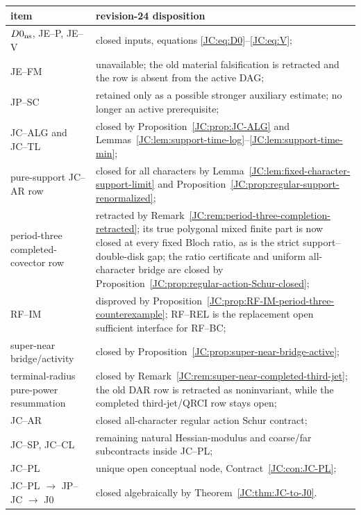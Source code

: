 \documentclass[11pt]{amsart}
\numberwithin{equation}{section}
\theoremstyle{definition}
\theoremstyle{remark}
\begin{document}
\begin{center}
\begin{longtable}{>{\raggedright\arraybackslash}p{.34\linewidth}
                  >{\raggedright\arraybackslash}p{.54\linewidth}}
\toprule
item & revision-24 disposition\\
\midrule
$D0_{\rm ns}$, JE--P, JE--V & closed inputs, equations
\eqref{JC:eq:D0}--\eqref{JC:eq:V};\\
JE--FM & unavailable; the old material falsification is retracted and the
row is absent from the active DAG;\\
JP--SC & retained only as a possible stronger auxiliary estimate; no
longer an active prerequisite;\\
JC--ALG and JC--TL & closed by Proposition~\ref{JC:prop:JC-ALG} and
Lemmas~\ref{JC:lem:support-time-log}--\ref{JC:lem:support-time-min};\\
pure-support JC--AR row & closed for all characters by
Lemma~\ref{JC:lem:fixed-character-support-limit} and
Proposition~\ref{JC:prop:regular-support-renormalized};\\
period-three completed-covector row & retracted by
Remark~\ref{JC:rem:period-three-completion-retracted}; its true polygonal
mixed finite part is now closed at every fixed Bloch ratio, as is the
strict support--double-disk gap; the ratio certificate and uniform
all-character bridge are closed by
Proposition~\ref{JC:prop:regular-action-Schur-closed};\\
RF--IM & disproved by
Proposition~\ref{JC:prop:RF-IM-period-three-counterexample}; RF--REL is the
replacement open sufficient interface for RF--BC;\\
super-near bridge/activity & closed by
Proposition~\ref{JC:prop:super-near-bridge-active};\\
terminal-radius pure-power resummation & closed by
Remark~\ref{JC:rem:super-near-completed-third-jet}; the old DAR row is
retracted as noninvariant, while the completed third-jet/QRCI row stays open;\\
JC--AR & closed all-character regular action Schur contract;\\
JC--SP, JC--CL & remaining natural Hessian-modulus and coarse/far
subcontracts inside JC--PL;\\
JC--PL & unique open conceptual node, Contract~\ref{JC:con:JC-PL};\\
JC--PL $\to$ JP--JC $\to$ J0 & closed algebraically by
Theorem~\ref{JC:thm:JC-to-J0}.\\
\bottomrule
\end{longtable}
\end{center}
\endgroup
\end{document}
